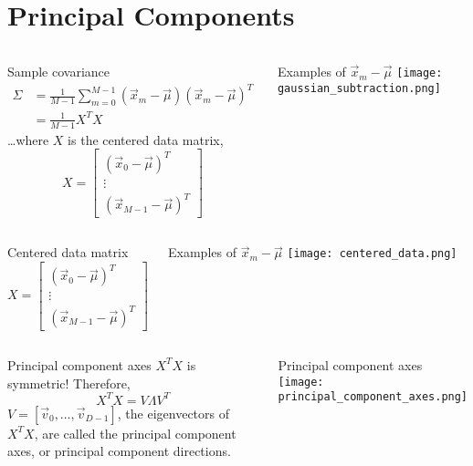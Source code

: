 \documentclass{beamer}
\begin{document}
\section[PCA]{Principal Components}
\setcounter{subsection}{1}

\begin{frame}
  \begin{columns}
    \column{2.25in}
    \begin{block}{Sample covariance}
      \begin{align*}
        \Sigma&=\frac{1}{M-1}\sum_{m=0}^{M-1}(\vec{x}_m-\vec\mu)(\vec{x}_m-\vec\mu)^T\\
        &=\frac{1}{M-1}X^TX
      \end{align*}
      \ldots where $X$ is the centered data matrix,
      \[
      X=\left[\begin{array}{c}
          (\vec{x}_0-\vec\mu)^T\\\vdots\\(\vec{x}_{M-1}-\vec\mu)^T\end{array}\right]
      \]
    \end{block}
    \column{2.125in}
    \begin{block}{Examples of $\vec{x}_m-\vec\mu$}
      \texttt{[image: gaussian\_subtraction.png]}
    \end{block}
  \end{columns}
\end{frame}

\begin{frame}
  \begin{columns}
    \column{1.75in}
    \begin{block}{Centered data matrix}
      \[
      X=\left[\begin{array}{c}
          (\vec{x}_0-\vec\mu)^T\\\vdots\\(\vec{x}_{M-1}-\vec\mu)^T\end{array}\right]
      \]
    \end{block}
    \column{2.625in}
    \begin{block}{Examples of $\vec{x}_m-\vec\mu$}
      \texttt{[image: centered\_data.png]}
    \end{block}
  \end{columns}
\end{frame}

\begin{frame}
  \begin{columns}
    \column{1.75in}
    \begin{block}{Principal component axes}
      $X^TX$ is symmetric!  Therefore,
      \[
      X^TX=V\Lambda V^T
      \]
      $V=[\vec{v}_0,\ldots,\vec{v}_{D-1}]$, the eigenvectors
      of $X^TX$, are called the principal component axes,
      or principal component directions.
    \end{block}
    \column{2.625in}
    \begin{block}{Principal component axes}
      \texttt{[image: principal\_component\_axes.png]}
    \end{block}
  \end{columns}
\end{frame}
\end{document}
